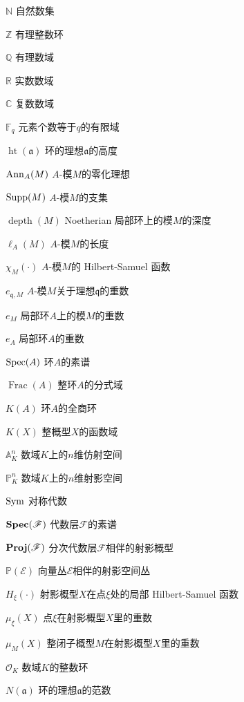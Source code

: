 \begin{denotation}[3cm]
\item[$\mathbb{N}$] 自然数集
\item[$\mathbb{Z}$] 有理整数环
\item[$\mathbb{Q}$] 有理数域
\item[$\mathbb{R}$] 实数数域
\item[$\mathbb{C}$] 复数数域
\item[$\mathbb{F}_q$] 元素个数等于$q$的有限域
\item[$\operatorname{ht}(\mathfrak{a})$] 环的理想$\mathfrak{a}$的高度
\item[$\operatorname{Ann}_A(M)$] $A$-模$M$的零化理想
\item[$\operatorname{Supp}(M)$] $A$-模$M$的支集
\item[$\operatorname{depth}(M)$] Noetherian 局部环上的模$M$的深度
\item[$\ell_A(M)$] $A$-模$M$的长度
\item[$\chi_M(\cdot)$] $A$-模$M$的 Hilbert-Samuel 函数
\item[$e_{\mathfrak{q},M}$] $A$-模$M$关于理想$\mathfrak{q}$的重数
\item[$e_{M}$] 局部环$A$上的模$M$的重数
\item[$e_{A}$] 局部环$A$的重数
\item[$\operatorname{Spec}(A)$] 环$A$的素谱
\item[$\operatorname{Frac}(A)$] 整环$A$的分式域
\item[$K(A)$] 环$A$的全商环
\item[$K(X)$] 整概型$X$的函数域
\item[$\mathbb{A}_K^n$] 数域$K$上的$n$维仿射空间
\item[$\mathbb{P}_K^n$] 数域$K$上的$n$维射影空间
\item[$\operatorname{Sym}$] 对称代数
\item[$\operatorname{\mathbf{Spec}}(\mathscr{F})$] 代数层$\mathscr{F}$的素谱
\item[$\operatorname{\mathbf{Proj}}(\mathscr{F})$] 分次代数层$\mathscr{F}$相伴的射影概型
\item[$\mathbb{P}(\mathscr{E})$] 向量丛$\mathscr{E}$相伴的射影空间丛
\item[$H_{\xi}(\cdot)$] 射影概型$X$在点$\xi$处的局部 Hilbert-Samuel 函数
\item[$\mu_{\xi}(X)$] 点$\xi$在射影概型$X$里的重数
\item[$\mu_M(X)$] 整闭子概型$M$在射影概型$X$里的重数
\item[$\mathcal{O}_K$] 数域$K$的整数环
\item[$N(\mathfrak{a})$] 环的理想$\mathfrak{a}$的范数

\end{denotation}
